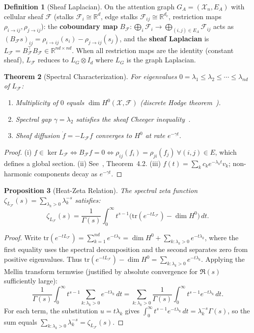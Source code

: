 \documentclass[11pt,a4paper]{article}
\theoremstyle{plain}
\newtheorem{theorem}{Theorem}[section]
\newtheorem{proposition}[theorem]{Proposition}
\theoremstyle{definition}
\newtheorem{definition}[theorem]{Definition}
\theoremstyle{remark}
\newcommand{\R}{\mathbb{R}}
\newcommand{\cF}{\mathcal{F}}
\newcommand{\cX}{\mathcal{X}}
\newcommand{\tr}{\mathrm{tr}}
\begin{document}
\begin{definition}[Sheaf Laplacian]\label{def:laplacian}
On the attention graph $G_A = (\cX_n, E_A)$ with cellular sheaf $\cF$ (stalks $\cF_i \cong \R^d$, edge stalks $\cF_{ij} \cong \R^{d_e}$, restriction maps $\rho_{i \to ij}, \rho_{j \to ij}$): the \textbf{coboundary map} $B_\cF: \bigoplus_i \cF_i \to \bigoplus_{(i,j) \in E_A} \cF_{ij}$ acts as $(B_\cF s)_{ij} = \rho_{i \to ij}(s_i) - \rho_{j \to ij}(s_j)$, and the \textbf{sheaf Laplacian} is $L_\cF = B_\cF^\top B_\cF \in \R^{nd \times nd}$. When all restriction maps are the identity (constant sheaf), $L_\cF$ reduces to $L_G \otimes I_d$ where $L_G$ is the graph Laplacian.
\end{definition}

\begin{theorem}[Spectral Characterization]\label{thm:spectral}
For eigenvalues $0 = \lambda_1 \leq \lambda_2 \leq \cdots \leq \lambda_{nd}$ of $L_\cF$:
\begin{enumerate}[label=(\roman*),nosep]
\item Multiplicity of $0$ equals $\dim H^0(\cX, \cF)$ (discrete Hodge theorem~\citep{hansen2019}).
\item Spectral gap $\gamma = \lambda_2$ satisfies the sheaf Cheeger inequality~\citep{hansen2020}.
\item Sheaf diffusion $\dot{f} = -L_\cF f$ converges to $H^0$ at rate $e^{-\gamma t}$.
\end{enumerate}
\end{theorem}

\begin{proof}
(i) $f \in \ker L_\cF \iff B_\cF f = 0 \iff \rho_{ij}(f_i) = \rho_{ji}(f_j)\ \forall (i,j) \in E$, which defines a global section. (ii) See~\citet{hansen2020}, Theorem~4.2. (iii) $f(t) = \sum_k c_k e^{-\lambda_k t}v_k$; non-harmonic components decay as $e^{-\gamma t}$.
\end{proof}

\begin{proposition}[Heat-Zeta Relation]\label{prop:heat-zeta}
The spectral zeta function $\zeta_{L_\cF}(s) = \sum_{\lambda_k > 0} \lambda_k^{-s}$ satisfies:
\[
\zeta_{L_\cF}(s) = \frac{1}{\Gamma(s)}\int_0^\infty t^{s-1}\bigl(\tr(e^{-tL_\cF}) - \dim H^0\bigr)\,dt.
\]
\end{proposition}

\begin{proof}
Write $\tr(e^{-tL_\cF}) = \sum_{k=1}^{nd} e^{-t\lambda_k} = \dim H^0 + \sum_{k:\lambda_k > 0} e^{-t\lambda_k}$, where the first equality uses the spectral decomposition and the second separates zero from positive eigenvalues. Thus $\tr(e^{-tL_\cF}) - \dim H^0 = \sum_{k:\lambda_k > 0} e^{-t\lambda_k}$. Applying the Mellin transform termwise (justified by absolute convergence for $\Re(s)$ sufficiently large):
\[
\frac{1}{\Gamma(s)}\int_0^\infty t^{s-1}\sum_{k:\lambda_k > 0} e^{-t\lambda_k}\,dt = \sum_{k:\lambda_k > 0}\frac{1}{\Gamma(s)}\int_0^\infty t^{s-1}e^{-t\lambda_k}\,dt.
\]
For each term, the substitution $u = t\lambda_k$ gives $\int_0^\infty t^{s-1}e^{-t\lambda_k}\,dt = \lambda_k^{-s}\Gamma(s)$, so the sum equals $\sum_{k:\lambda_k>0}\lambda_k^{-s} = \zeta_{L_\cF}(s)$.
\end{proof}
\end{document}
